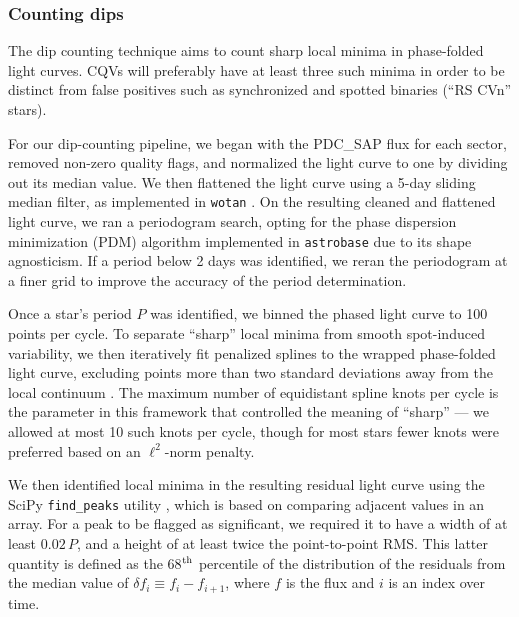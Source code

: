 \documentclass[11pt,twocolumn,tighten]{aastex63}
\begin{document}
\subsubsection{Counting dips}
\label{subsec:counting}

The dip counting technique aims to count sharp local minima in
phase-folded light curves.  CQVs will preferably have at least three
such minima in order to be distinct from false positives such as
synchronized and spotted binaries (``RS CVn'' stars). 

For our dip-counting pipeline, we began with the PDC\_SAP flux for
each sector, removed non-zero quality flags, and normalized the light
curve to one by dividing out its median value.  We then flattened the
light curve using a 5-day sliding median filter, as implemented in
\texttt{wotan} \citep{2019AJ....158..143H}.  On the resulting cleaned
and flattened light curve, we ran a periodogram search, opting for the
\citet{1978ApJ...224..953S} phase dispersion minimization (PDM)
algorithm implemented in \texttt{astrobase}
\citep{2021zndo...1011188B} due to its shape agnosticism.  If a period
below 2 days was identified, we reran the periodogram at a finer grid
to improve the accuracy of the period determination.

Once a star's period $P$ was identified, we binned the phased light
curve to 100 points per cycle.  To separate ``sharp'' local minima
from smooth spot-induced variability, we then iteratively fit
penalized splines to the wrapped phase-folded light curve, excluding
points more than two standard deviations away from the local continuum
\citep{2019AJ....158..143H}.  The maximum number of equidistant spline
knots per cycle is the parameter in this framework that controlled the
meaning of ``sharp'' --- we allowed at most 10 such knots per cycle,
though for most stars fewer knots were preferred based on an
$\ell^2$-norm penalty. 

We then identified local minima in the resulting residual light curve
using the SciPy \texttt{find\_peaks} utility
\citep{2020NatMe..17..261V}, which is based on comparing adjacent
values in an array.  For a peak to be flagged as significant, we
required it to have a width of at least $0.02\,P$, and a height of at
least twice the point-to-point RMS.  This latter quantity is defined
as the 68$^{\rm th}$ percentile of the distribution of the residuals
from the median value of $\delta f_i \equiv f_i - f_{i+1}$, where $f$
is the flux and $i$ is an index over time.
\end{document}
